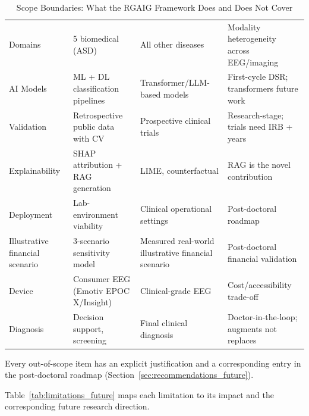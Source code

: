 \begin{table}[!htbp]
\tablestripes\tablefontsize
\tablefontsize
\caption[Scope Boundaries]{Scope Boundaries: What the RGAIG Framework Does and Does Not Cover}
\begin{tabularx}{\textwidth}{@{} L L L L @{}}
\toprule
{} &  &  &  \\
\midrule
Domains & 5 biomedical (ASD) & All other diseases & Modality heterogeneity across EEG/imaging \\
\addlinespace
AI Models & ML + DL classification pipelines & Transformer/LLM-based models & First-cycle DSR; transformers future work \\
\addlinespace
Validation & Retrospective public data with CV & Prospective clinical trials & Research-stage; trials need IRB + years \\
\addlinespace
Explainability & SHAP attribution + RAG generation & LIME, counterfactual & RAG is the novel contribution \\
\addlinespace
Deployment & Lab-environment viability & Clinical operational settings & Post-doctoral roadmap \\
\addlinespace
Illustrative financial scenario & 3-scenario sensitivity model & Measured real-world illustrative financial scenario & Post-doctoral financial validation \\
\addlinespace
Device & Consumer EEG (Emotiv EPOC X/Insight) & Clinical-grade EEG & Cost/accessibility trade-off \\
\addlinespace
Diagnosis & Decision support, screening & Final clinical diagnosis & Doctor-in-the-loop; augments not replaces \\
\bottomrule
\end{tabularx}
\end{table}

\noindent Every out-of-scope item has an explicit justification and a corresponding entry in the post-doctoral roadmap (Section~\ref{sec:recommendations_future}).

\noindent Table~\ref{tab:limitations_future} maps each limitation to its impact and the corresponding future research direction.

